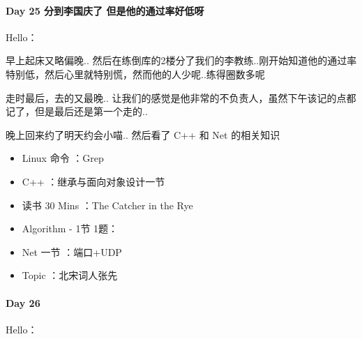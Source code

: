 \documentclass[UTF8,a4paper,8pt]{ctexart}
\begin{document}
 	 \paragraph{Day 25  分到李国庆了   \quad   但是他的通过率好低呀  }Hello：\
 	 
	 	 早上起床又略偏晚.. 然后在练倒库的2楼分了我们的李教练..刚开始知道他的通过率特别低，然后心里就特别慌，然而他的人少呢..练得圈数多呢
	 	 
	 	 走时最后，去的又最晚.. 让我们的感觉是他非常的不负责人，虽然下午该记的点都记了，但是最后还是第一个走的..
	 	 
	 	 晚上回来约了明天约会小喵.. 然后看了 C++ 和 Net 的相关知识
 	 
	 	 \begin{itemize}
	 	 	\item  \makebox[0pt][l]{$\square$}\hspace{1em} Linux 命令 ：Grep
	 	 	\item  \makebox[0pt][l]{$\square$}\hspace{1em} C++ ：继承与面向对象设计一节
	 	 	
	 	 	\item  \makebox[0pt][l]{$\square$}\raisebox{.15ex}{\hspace{0.1em}$\checkmark$} 读书  30 Mins	：The Catcher in the Rye	 	 
	 	 	\item  \makebox[0pt][l]{$\square$}\hspace{1em} Algorithm - 1节 1题：
	 	 	\item  \makebox[0pt][l]{$\square$}\raisebox{.15ex}{\hspace{0.1em}$\checkmark$} Net 一节 ：端口+UDP
	 	 	
	 	 	\item  \makebox[0pt][l]{$\square$}\raisebox{.15ex}{\hspace{0.1em}$\checkmark$} Topic ：北宋词人张先
	 	 \end{itemize}
 	 \paragraph{Day 26      \quad     }Hello：
 	 
\end{document}
